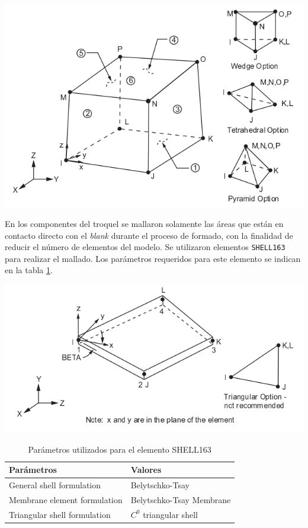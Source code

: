 \begin{center}
\includegraphics[scale=0.65]{src/ch3/solid164.png}
\label{fig:solid164}
\end{center}

En los componentes del troquel se mallaron solamente las áreas que están en contacto directo con el 
\textit{blank} durante el proceso de formado, con la finalidad de reducir el número de elementos del modelo. 
Se utilizaron elementos \texttt{SHELL163} para realizar el mallado. Los parámetros requeridos para 
este elemento se indican en la tabla \ref{tab:shell_param}.

\begin{center}
\includegraphics[scale=0.65]{src/ch3/shell163.png}
\label{fig:shell163}
\end{center}


\begin{table}[h]
\centering
\caption{Parámetros utilizados para el elemento SHELL163}
\label{}
\begin{tabular}{p{6cm} p{6cm}} \hline
Parámetros & Valores \\
\hline
General shell formulation & Belytschko-Tsay \\
Membrane element formulation & Belytschko-Tsay Membrane \\
Triangular shell formulation & $C^0$ triangular shell \\
\hline
\end{tabular}
\label{tab:shell_param}
\end{table}


